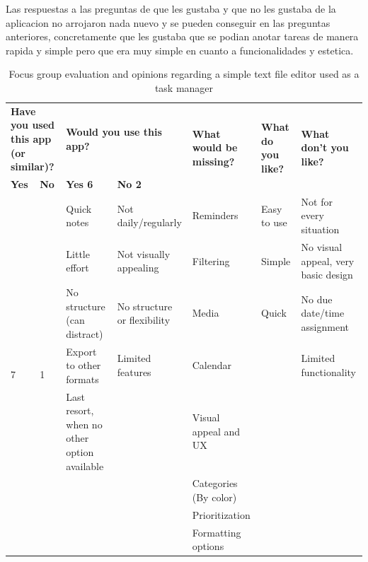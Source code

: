Las respuestas a las preguntas de que les gustaba y que no les gustaba de la aplicacion no arrojaron nada nuevo y se pueden conseguir en las preguntas anteriores, concretamente que les gustaba que se podian anotar tareas de manera rapida y simple pero que era muy simple en cuanto a funcionalidades y estetica.

\FloatBarrier
\begin{table}[!htbp]
    \centering
    \begin{adjustbox}{width=1.2\textwidth,center=\textwidth}
        \begin{tabular}{|l|l|l|l|l|l|l|}
        \hline
        \multicolumn{2}{|l}{\textbf{Have you used this app (or similar)?}} & \multicolumn{2}{|l|}{\textbf{Would you use this app?}} & \multirow{2}{*}{\textbf{What would be missing?}} & \multirow{2}{*}{\textbf{What do you like?}} & \multirow{2}{*}{\textbf{What don't you like?}} \\ \cline{1-4}
        \textbf{Yes} & \textbf{No} & \textbf{Yes  6} & \textbf{No  2} & & & \\
        \hline
        \multirow{9}{*}{ 7 } & \multirow{9}{*}{ 1 } & Quick notes & Not daily/regularly & Reminders & Easy to use & Not for every situation \\ \cline{3-7}
        & & Little effort & Not visually appealing & Filtering & Simple & No visual appeal, very basic design \\ \cline{3-7}
        & & No structure (can distract) & No structure or flexibility & Media & Quick & No due date/time assignment \\ \cline{3-7}
        & & Export to other formats & Limited features & Calendar & & Limited functionality \\ \cline{3-7}
        & & Last resort, when no other option available & & Visual appeal and UX & & \\ \cline{3-7}
        & & & & Categories (By color) & & \\ \cline{3-7}
        & & & & Prioritization & & \\ \cline{3-7}
        & & & & Formatting options & & \\ \hline
        \end{tabular}
    \end{adjustbox}
    \caption{Focus group evaluation and opinions regarding a simple text file editor used as a task manager}
    \label{tab:simpleTextFileEval}
\end{table}
\FloatBarrier

